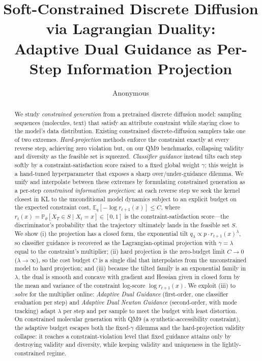\documentclass{article}
\title{Soft-Constrained Discrete Diffusion via Lagrangian Duality:\\ Adaptive Dual Guidance as Per-Step Information Projection}
\author{Anonymous}
\date{}
\newcommand{\E}{\mathbb{E}}
\begin{document}
\maketitle

\begin{abstract}
We study \emph{constrained generation} from a pretrained discrete diffusion model: sampling sequences (molecules, text) that satisfy an attribute constraint while staying close to the model's data distribution. Existing constrained discrete-diffusion samplers take one of two extremes. \emph{Hard-projection} methods enforce the constraint exactly at every reverse step, achieving zero violation but, on our QM9 benchmarks, collapsing validity and diversity as the feasible set is squeezed. \emph{Classifier guidance} instead tilts each step softly by a constraint-satisfaction score raised to a fixed global weight $\gamma$; this weight is a hand-tuned hyperparameter that exposes a sharp over/under-guidance dilemma. We unify and interpolate between these extremes by formulating constrained generation as a per-step \emph{constrained information projection}: at each reverse step we seek the kernel closest in KL to the unconditional model dynamics subject to an explicit budget on the expected constraint cost, $\E_q[-\log r_{t+1}(x)]\le C$, where $r_t(x)=\mathbb P_\theta[X_T\in S\mid X_t=x]\in[0,1]$ is the constraint-satisfaction score---the discriminator's probability that the trajectory ultimately lands in the feasible set $S$. We show (i) the projection has a closed form, the exponential tilt $q_\lambda\propto p\cdot r_{t+1}(x)^\lambda$, so classifier guidance is recovered as the Lagrangian-optimal projection with $\gamma=\lambda$ equal to the constraint's multiplier; (ii) hard projection is the zero-budget limit $C\to0$ ($\lambda\to\infty$), so the cost budget $C$ is a single dial that interpolates from the unconstrained model to hard projection; and (iii) because the tilted family is an exponential family in $\lambda$, the dual is smooth and concave with gradient and Hessian given in closed form by the mean and variance of the constraint log-score $\log r_{t+1}(x)$. We exploit (iii) to \emph{solve} for the multiplier online: \emph{Adaptive Dual Guidance} (first-order, one classifier evaluation per step) and \emph{Adaptive Dual Newton Guidance} (second-order, with mode tracking) adapt $\lambda$ per step and per sample to meet the budget with least distortion. On constrained molecular generation with QM9 (a synthetic-accessibility constraint), the adaptive budget escapes both the fixed-$\gamma$ dilemma and the hard-projection validity collapse: it reaches a constraint-violation level that fixed guidance attains only by destroying validity and diversity, while keeping validity and uniqueness in the lightly-constrained regime.
\end{abstract}
\end{document}
